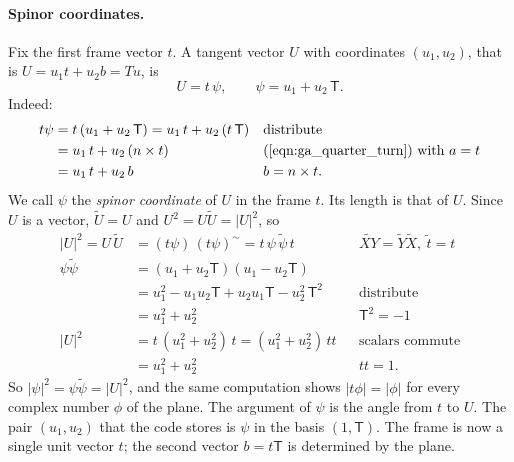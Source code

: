 \paragraph{Spinor coordinates.} Fix the first frame vector $t$. A tangent vector $U$ with coordinates $(u_1, u_2)$, that is $U = u_1 t + u_2 b = Tu$, is
\begin{equation}
\label{eqn:ga_spinor}
U = t\, \psi, \qquad \psi = u_1 + u_2\, \mathsf T .
\end{equation}
Indeed:
\begin{align*}
t\psi &= t\,(u_1 + u_2\,\mathsf T) = u_1\, t + u_2\,(t\,\mathsf T) && \text{distribute} \\
&= u_1\, t + u_2\,(n\times t) && (\ref{eqn:ga_quarter_turn}) \text{ with } a = t \\
&= u_1\, t + u_2\, b && b = n\times t .
\end{align*}
We call $\psi$ the \emph{spinor coordinate} of $U$ in the frame $t$. Its length is that of $U$. Since $U$ is a vector, $\widetilde U = U$ and $U^2 = U\widetilde U = |U|^2$, so
\begin{align*}
|U|^2 = U\,\widetilde U &= (t\psi)\,(t\psi)^\sim = t\,\psi\,\widetilde\psi\, t && \widetilde{XY} = \widetilde Y\widetilde X,\ \widetilde t = t \\
\psi\widetilde\psi &= (u_1 + u_2\mathsf T)(u_1 - u_2\mathsf T) \\
&= u_1^2 - u_1u_2\mathsf T + u_2u_1\mathsf T - u_2^2\,\mathsf T^2 && \text{distribute} \\
&= u_1^2 + u_2^2 && \mathsf T^2 = -1 \\
|U|^2 &= t\,(u_1^2 + u_2^2)\, t = (u_1^2 + u_2^2)\, t t && \text{scalars commute} \\
&= u_1^2 + u_2^2 && tt = 1 .
\end{align*}
So $|\psi|^2 = \psi\widetilde\psi = |U|^2$, and the same computation shows $|t\phi| = |\phi|$ for every complex number $\phi$ of the plane. The argument of $\psi$ is the angle from $t$ to $U$. The pair $(u_1, u_2)$ that the code stores is $\psi$ in the basis $(1, \mathsf T)$. The frame is now a single unit vector $t$; the second vector $b = t\mathsf T$ is determined by the plane.

